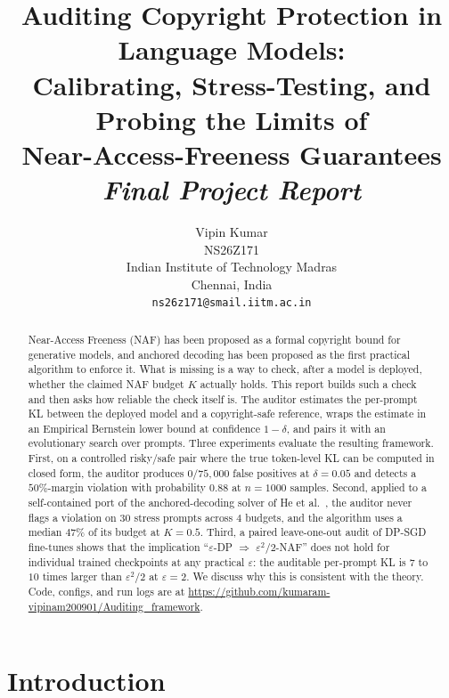\documentclass{article}
\title{Auditing Copyright Protection in Language Models:\\
  Calibrating, Stress-Testing, and Probing the Limits of\\
  Near-Access-Freeness Guarantees\\[4pt]
  \normalsize \textit{Final Project Report}}
\author{
  Vipin Kumar \\
  NS26Z171 \\
  Indian Institute of Technology Madras \\
  Chennai, India \\
  \texttt{ns26z171@smail.iitm.ac.in}
}
\begin{document}
\maketitle

\begin{abstract}
Near-Access Freeness (NAF) has been proposed as a formal copyright bound for generative models, and anchored decoding has been proposed as the first practical algorithm to enforce it.  What is missing is a way to check, after a model is deployed, whether the claimed NAF budget $K$ actually holds.  This report builds such a check and then asks how reliable the check itself is.  The auditor estimates the per-prompt KL between the deployed model and a copyright-safe reference, wraps the estimate in an Empirical Bernstein lower bound at confidence $1-\delta$, and pairs it with an evolutionary search over prompts.  Three experiments evaluate the resulting framework.  First, on a controlled risky/safe pair where the true token-level KL can be computed in closed form, the auditor produces $0/75{,}000$ false positives at $\delta=0.05$ and detects a $50\%$-margin violation with probability $0.88$ at $n=1000$ samples.  Second, applied to a self-contained port of the anchored-decoding solver of He et al.~\cite{he2026anchored}, the auditor never flags a violation on $30$ stress prompts across $4$ budgets, and the algorithm uses a median $47\%$ of its budget at $K=0.5$.  Third, a paired leave-one-out audit of DP-SGD fine-tunes shows that the implication ``$\varepsilon$-DP $\Rightarrow$ $\varepsilon^2/2$-NAF'' does not hold for individual trained checkpoints at any practical $\varepsilon$: the auditable per-prompt KL is $7$ to $10$ times larger than $\varepsilon^2/2$ at $\varepsilon=2$.  We discuss why this is consistent with the theory.  Code, configs, and run logs are at \url{https://github.com/kumaram-vipinam200901/Auditing\_framework}.
\end{abstract}


\section{Introduction}
\label{sec:intro}
\end{document}
